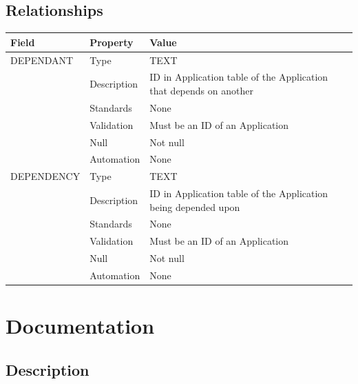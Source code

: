 \subsection{Relationships}\label{relationships-8}

\begin{longtable}[]{@{}
  >{\raggedright\arraybackslash}p{}
  >{\raggedright\arraybackslash}p{}
  >{\raggedright\arraybackslash}p{}@{}}
\toprule\noalign{}
\begin{minipage}[b]{\linewidth}\raggedright
Field
\end{minipage} & \begin{minipage}[b]{\linewidth}\raggedright
Property
\end{minipage} & \begin{minipage}[b]{\linewidth}\raggedright
Value
\end{minipage} \\
\midrule\noalign{}
\endhead
\bottomrule\noalign{}
\endlastfoot
DEPENDANT & Type & TEXT \\
& Description & ID in Application table of the Application that depends
on another \\
& Standards & None \\
& Validation & Must be an ID of an Application \\
& Null & Not null \\
& Automation & None \\
DEPENDENCY & Type & TEXT \\
& Description & ID in Application table of the Application being
depended upon \\
& Standards & None \\
& Validation & Must be an ID of an Application \\
& Null & Not null \\
& Automation & None \\
\end{longtable}

\section{Documentation}\label{documentation}

\subsection{Description}\label{description-11}

